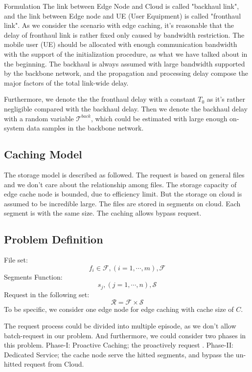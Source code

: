 \documentclass{article}
\begin{document}
\begin{section}{Formulation}
    The link between Edge Node and Cloud is called "backhaul link", and the link between Edge node and UE (User Equipment) is called "fronthaul link".
    As we consider the scenario with edge caching, it's reasonable that the delay of fronthaul link is rather fixed only caused by bandwidth restriction. The mobile user (UE) should be allocated with enough communication bandwidth with the support of the initialization procedure, as what we have talked about in the beginning. The backhaul is always assumed with large bandwidth supported by the backbone network, and the propagation and processing delay compose the major factors of the total link-wide delay.

    Furthermore, we denote the the fronthaul delay with a constant $T_0$ as it's rather negligible compared with the backhaul delay. Then we denote the backhaul delay with a random variable $\mathcal{T}^{back}$, which could be estimated with large enough on-system data samples in the backbone network.
    
    \subsection{Caching Model}
    The storage model is described as followed. The request is based on general files and we don't care about the relationship among files.
    The storage capacity of edge cache node is bounded, due to efficiency limit. But the storage on cloud is assumed to be incredible large. The files are stored in segments on cloud. Each segment is with the same size.
    The caching allows bypass request.

    \subsection{Problem Definition}
    File set:
    $$
    f_i\in\mathcal{F},(i=1,\cdots,m), \mathcal{F}
    $$
    Segments Function:
    $$
    s_j,(j=1,\cdots,n), \mathcal{S}
    $$
    Request in the following set:
    $$
    \mathcal{R}=\mathcal{F}\times\mathcal{S}
    $$
    To be specific, we consider one edge node for edge caching with cache size of $C$.

    The request process could be divided into multiple episode, as we don't allow batch-request in our problem.
    And furthermore, we could consider two phases in this problem.
    Phase-I: Proactive Caching; the proactively request .
    Phase-II: Dedicated Service; the cache node serve the hitted segments, and bypass the un-hitted request from Cloud.


\end{section}
\end{document}

